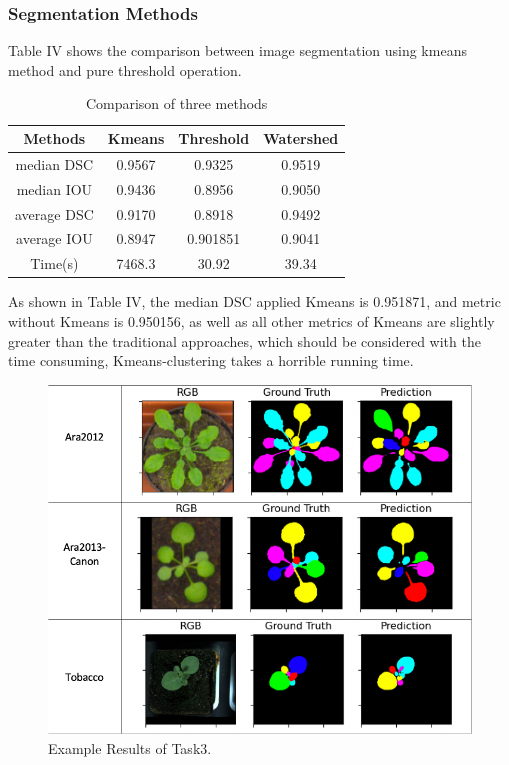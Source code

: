 \documentclass[conference]{IEEEtran}
\begin{document}
\subsubsection{ Segmentation Methods}
Table IV shows the comparison between image segmentation using kmeans method and pure threshold operation.
\begin{table}[htbp]
\caption{Comparison of three methods }
\begin{center}
\begin{tabular}{|c|c|c|c|}

\hline
Methods&Kmeans &Threshold& Watershed \\
\hline
median DSC  &0.9567&0.9325 & 0.9519\\
\hline
median IOU &0.9436 &0.8956   & 0.9050\\
\hline
average DSC  &0.9170 &0.8918 & 0.9492\\
\hline
average IOU &0.8947 &0.901851    & 0.9041\\
\hline
Time(s) &7468.3 &30.92&39.34\\
\hline

\end{tabular}
\label{tab4}
\end{center}
\end{table}

As shown in Table IV, the median DSC applied Kmeans is 0.951871,
and metric without Kmeans is 0.950156, as well as all other metrics of Kmeans 
are slightly greater than the traditional approaches, which should be considered with the time consuming,
Kmeans-clustering takes a horrible running time.

\begin{figure}[htbp]
\centerline{\includegraphics[scale=1.1]{T3.png}}
\caption{Example Results of Task3.}
\label{fig4}
\end{figure}
\end{document}
